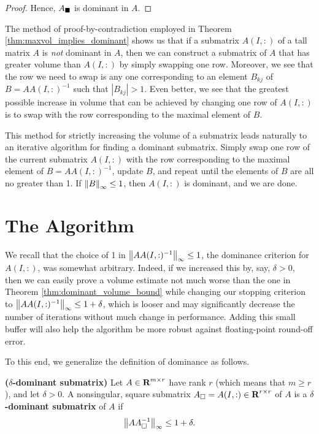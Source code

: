 \documentclass{article}
\begin{document}
\begin{thm}
\begin{proof}
			Hence, $A_\blacksquare$ is dominant in $A$.
		\end{proof}
	\end{thm}
	
	
	The method of proof-by-contradiction employed in Theorem \ref{thm:maxvol_implies_dominant} shows us that if a submatrix $A(I,:)$ of a tall matrix $A$ is \textit{not} dominant in $A$, then we can construct a submatrix of $A$ that has greater volume than $A(I,:)$ by simply swapping one row. Moreover, we see that the row we need to swap is any one corresponding to an element $B_{kj}$ of $B = AA(I,:)^{-1}$ such that $|B_{kj}| > 1$. Even better, we see that the greatest possible increase in volume that can be achieved by changing one row of $A(I,:)$ is to swap with the row corresponding to the maximal element of $B$.
	
	This method for strictly increasing the volume of a submatrix leads naturally to an iterative algorithm for finding a dominant submatrix. Simply swap one row of the current submatrix $A(I,:)$ with the row corresponding to the maximal element of $B = AA(I,:)^{-1}$, update $B$, and repeat until the elements of $B$ are all no greater than 1. If $\left\lVert B \right\rVert_\infty \le 1$, then $A(I,:)$ is dominant, and we are done.
	
	\section{The \maxvol{} Algorithm}
	
	
	We recall that the choice of 1 in $\left\lVert AA(I,:)^{-1} \right\rVert_\infty \le 1$, the dominance criterion for $A(I,:)$, was somewhat arbitrary. Indeed, if we increased this by, say, $\delta > 0$, then we can easily prove a volume estimate not much worse than the one in Theorem \ref{thm:dominant_volume_bound} while changing our stopping criterion to $\left\lVert AA(I,:)^{-1} \right\rVert_\infty \le 1 + \delta$, which is looser and may significantly decrease the number of iterations without much change in performance. Adding this small buffer will also help the algorithm be more robust against floating-point round-off error.
	
	To this end, we generalize the definition of dominance as follows.
	
	\begin{dfn} \textnormal{\bf($\delta$-dominant submatrix)}
		\label{def:delta_dominant_submatrix}
		Let $A \in \textnormal{\bf R}^{m\times r}$ have rank $r$ (which means that $m \ge r$), and let $\delta > 0$. A nonsingular, square submatrix $A_\square = A(I,:) \in \textnormal{\bf R}^{r\times r}$ of $A$ is a \textbf{$\delta$-dominant submatrix} of $A$ if
		\begin{equation}
			\left\lVert AA_{\square}^{-1} \right\rVert_\infty \le 1 + \delta.
		\end{equation}
	\end{dfn}
	
\end{document}

